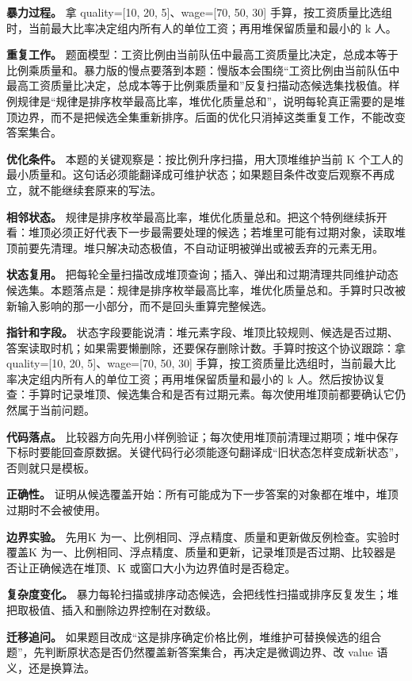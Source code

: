 \textbf{暴力过程。} 拿 quality=[10, 20, 5]、wage=[70, 50, 30] 手算，按工资质量比选组时，当前最大比率决定组内所有人的单位工资；再用堆保留质量和最小的 k 人。

\textbf{重复工作。} 题面模型：工资比例由当前队伍中最高工资质量比决定，总成本等于比例乘质量和。暴力版的慢点要落到本题：慢版本会围绕“工资比例由当前队伍中最高工资质量比决定，总成本等于比例乘质量和”反复扫描动态候选集找极值。样例规律是“规律是排序枚举最高比率，堆优化质量总和”，说明每轮真正需要的是堆顶边界，而不是把候选全集重新排序。后面的优化只消掉这类重复工作，不能改变答案集合。

\textbf{优化条件。} 本题的关键观察是：按比例升序扫描，用大顶堆维护当前 K 个工人的最小质量和。这句话必须能翻译成可维护状态；如果题目条件改变后观察不再成立，就不能继续套原来的写法。

\textbf{相邻状态。} 规律是排序枚举最高比率，堆优化质量总和。把这个特例继续拆开看：堆顶必须正好代表下一步最需要处理的候选；若堆里可能有过期对象，读取堆顶前要先清理。堆只解决动态极值，不自动证明被弹出或被丢弃的元素无用。

\textbf{状态复用。} 把每轮全量扫描改成堆顶查询；插入、弹出和过期清理共同维护动态候选集。本题落点是：规律是排序枚举最高比率，堆优化质量总和。手算时只改被新输入影响的那一小部分，而不是回头重算完整候选。

\textbf{指针和字段。} 状态字段要能说清：堆元素字段、堆顶比较规则、候选是否过期、答案读取时机；如果需要懒删除，还要保存删除计数。手算时按这个协议跟踪：拿 quality=[10, 20, 5]、wage=[70, 50, 30] 手算，按工资质量比选组时，当前最大比率决定组内所有人的单位工资；再用堆保留质量和最小的 k 人。然后按协议复查：手算时记录堆顶、候选集合和是否有过期元素。每次使用堆顶前都要确认它仍然属于当前问题。

\textbf{代码落点。} 比较器方向先用小样例验证；每次使用堆顶前清理过期项；堆中保存下标时要能回查原数据。关键代码行必须能逐句翻译成“旧状态怎样变成新状态”，否则就只是模板。

\textbf{正确性。} 证明从候选覆盖开始：所有可能成为下一步答案的对象都在堆中，堆顶过期时不会被使用。

\textbf{边界实验。} 先用K 为一、比例相同、浮点精度、质量和更新做反例检查。实验时覆盖K 为一、比例相同、浮点精度、质量和更新，记录堆顶是否过期、比较器是否让正确候选在堆顶、K 或窗口大小为边界值时是否稳定。

\textbf{复杂度变化。} 暴力每轮扫描或排序动态候选，会把线性扫描或排序反复发生；堆把取极值、插入和删除边界控制在对数级。

\textbf{迁移追问。} 如果题目改成“这是排序确定价格比例，堆维护可替换候选的组合题”，先判断原状态是否仍然覆盖新答案集合，再决定是微调边界、改 value 语义，还是换算法。

